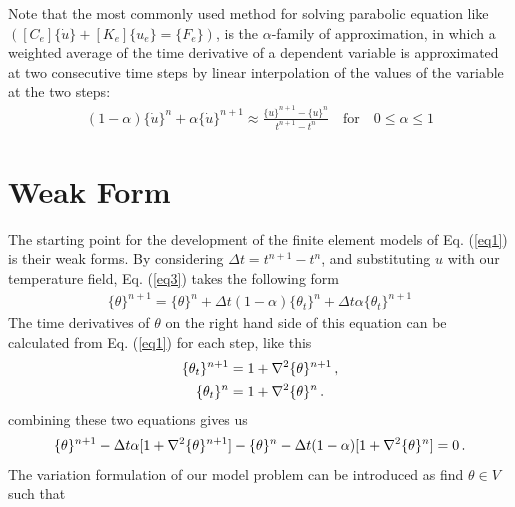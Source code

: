 \documentclass[]{article}
\begin{document}
Note that the most commonly used method for solving parabolic equation like $([C_e ]\{\dot{u}\} + [K_e]\{u_e \} = \{F_e \})$, is the $\alpha$-family of approximation, in which a weighted average of the time derivative of a dependent variable is approximated at two consecutive time steps by linear interpolation of the values of the variable at the two steps:
\begin{equation}\label{eq3}
	\begin{aligned}
		(1 - \alpha)\{\dot{u}\}^n + \alpha\{\dot{u}\}^{n+1} \approx \frac{\{u\}^{n+1} - \{u\}^n}{t^{n+1} - t^{n}}  \quad \text{for} \quad 0 \leq \alpha \leq 1
	\end{aligned}
\end{equation}
\section{Weak Form} \label{sec: wf}
The starting point for the development of the finite element models of Eq. (\ref{eq1}) is their weak forms. By considering $\Delta t = t^{n+1} - t^{n}$, and substituting $u$ with our temperature field, Eq. (\ref{eq3})  takes the following form
\begin{equation}\label{eq4}
	\begin{aligned}
		\{\theta\}^{n+1} = \{\theta\}^n + \Delta t(1 - \alpha)\{\theta_t\}^n + \Delta t\alpha\{\theta_t\}^{n+1}
	\end{aligned}
\end{equation}
The time derivatives of $\theta$ on the right hand side of this equation can be calculated from Eq. (\ref{eq1}) for each step, like this 
\begin{equation}\label{eq5}
	\begin{aligned}
		\{\theta_t\}^{n+1} &= 1 + \nabla^2 \{\theta\}^{n+1}\thinspace,\\
		\{\theta_t\}^{n} &= 1 + \nabla^2 \{\theta\}^{n}\thinspace. \\
	\end{aligned}
\end{equation}
combining these two equations gives us
\begin{equation}\label{eq6}
	\begin{aligned}
		\{\theta\}^{n+1} -\Delta t\alpha[1 + \nabla^2 \{\theta\}^{n+1}] - \{\theta\}^n - \Delta t(1 - \alpha)[1 + \nabla^2 \{\theta\}^{n}]=0\thinspace .
	\end{aligned}
\end{equation}
The variation formulation of our model problem can be introduced as find $\theta \in V$ such that
\end{document}
